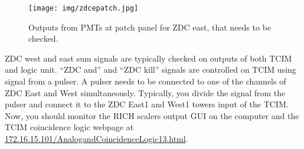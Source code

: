\begin{figure}[htb]
\begin{center}
\texttt{[image: img/zdcepatch.jpg]}
\end{center}
\caption{Outputs from PMTs at patch panel for ZDC east, that needs to be checked.}
\label{zdcepatch}
\end{figure}

ZDC west and east sum signals are typically checked on outputs of both TCIM and logic unit. ``ZDC and'' and ``ZDC kill'' signals are controlled on TCIM using  signal from a pulser. A pulser needs to be connected to one of the channels of ZDC East and West simultaneously. Typically, you divide the signal from the pulser and connect it to the ZDC East1 and West1 towers input of the TCIM. Now, you should monitor the RICH scalers output GUI on the  computer and the TCIM coincidence logic webpage at \url{172.16.15.101/AnalogandCoincidenceLogic13.html}.
